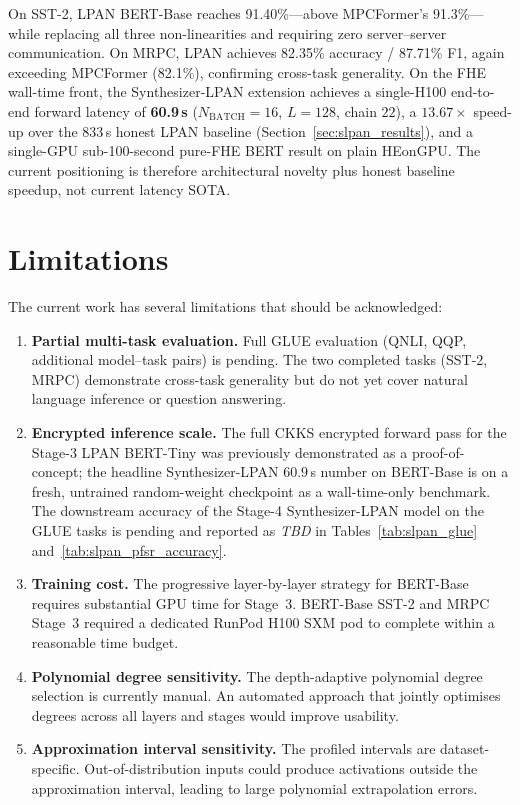 On SST-2, LPAN BERT-Base reaches 91.40\%---above MPCFormer's 91.3\%---while replacing all three non-linearities and requiring zero server--server communication. On MRPC, LPAN achieves 82.35\% accuracy / 87.71\% F1, again exceeding MPCFormer (82.1\%), confirming cross-task generality. On the FHE wall-time front, the Synthesizer-LPAN extension achieves a single-H100 end-to-end forward latency of \textbf{60.9\,s} ($N_{\mathrm{BATCH}} = 16$, $L = 128$, chain $22$), a $\mathbf{13.67\times}$ speed-up over the $833$\,s honest LPAN baseline (Section~\ref{sec:slpan_results}), and a single-GPU sub-100-second pure-FHE BERT result on plain HEonGPU. The current positioning is therefore architectural novelty plus honest baseline speedup, not current latency SOTA.

\section{Limitations}

The current work has several limitations that should be acknowledged:

\begin{enumerate}
    \item \textbf{Partial multi-task evaluation.} Full GLUE evaluation (QNLI, QQP, additional model--task pairs) is pending. The two completed tasks (SST-2, MRPC) demonstrate cross-task generality but do not yet cover natural language inference or question answering.

    \item \textbf{Encrypted inference scale.} The full CKKS encrypted forward pass for the Stage-3 LPAN BERT-Tiny was previously demonstrated as a proof-of-concept; the headline Synthesizer-LPAN $60.9$\,s number on BERT-Base is on a fresh, untrained random-weight checkpoint as a wall-time-only benchmark. The downstream accuracy of the Stage-4 Synthesizer-LPAN model on the GLUE tasks is pending and reported as \textit{TBD} in Tables~\ref{tab:slpan_glue} and~\ref{tab:slpan_pfsr_accuracy}.

    \item \textbf{Training cost.} The progressive layer-by-layer strategy for BERT-Base requires substantial GPU time for Stage~3. BERT-Base SST-2 and MRPC Stage~3 required a dedicated RunPod H100 SXM pod to complete within a reasonable time budget.

    \item \textbf{Polynomial degree sensitivity.} The depth-adaptive polynomial degree selection is currently manual. An automated approach that jointly optimises degrees across all layers and stages would improve usability.

    \item \textbf{Approximation interval sensitivity.} The profiled intervals are dataset-specific. Out-of-distribution inputs could produce activations outside the approximation interval, leading to large polynomial extrapolation errors.
\end{enumerate}


